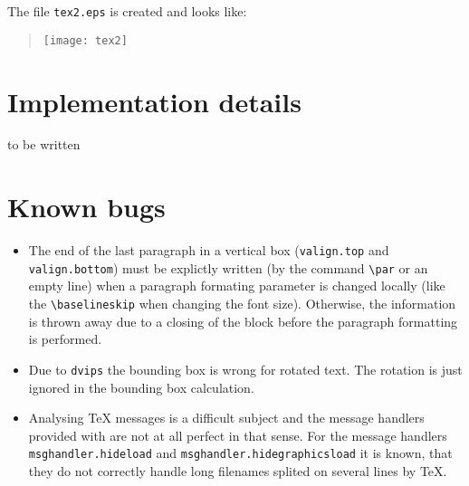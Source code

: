 The file \verb|tex2.eps| is created and looks like:
\begin{quote}
\texttt{[image: tex2]}
\end{quote}

\section{Implementation details}
to be written

\section{Known bugs}
\begin{itemize}
\item The end of the last paragraph in a vertical box
(\verb|valign.top| and \verb|valign.bottom|) must be explictly
written (by the command \verb|\par| or an empty line) when a paragraph
formating parameter is changed locally (like the \verb|\baselineskip|
when changing the font size).  Otherwise, the information is thrown
away due to a closing of the block before the paragraph formatting is
performed.
\item Due to \verb|dvips| the bounding box is wrong for rotated text.
The rotation is just ignored in the bounding box calculation.
\item Analysing \TeX{} messages is a difficult subject and the message
handlers provided with \PyX{} are not at all perfect in that sense.
For the message handlers \verb|msghandler.hideload| and
\verb|msghandler.hidegraphicsload| it is known, that they do not
correctly handle long filenames splited on several lines by \TeX.
\end{itemize}
